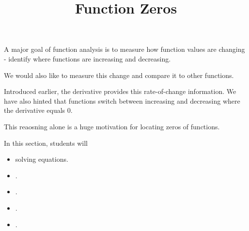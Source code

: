 \documentclass{ximera}
\title{Function Zeros}
\begin{document}
\begin{abstract}
\end{abstract}
\maketitle




A major goal of function analysis is to measure how function values are changing - identify where functions are increasing and decreasing.

We would also like to measure this change and compare it to other functions.


Introduced earlier, the derivative provides this rate-of-change information.  We have also hinted that functions switch between increasing and decreasing where the derivative equals $0$.

This reaosning alone is a huge motivation for locating zeros of functions.










\begin{sectionOutcomes}
In this section, students will 

\begin{itemize}
\item solving equations.
\item .
\item .
\item .
\item .
\end{itemize}
\end{sectionOutcomes}
\end{document}
